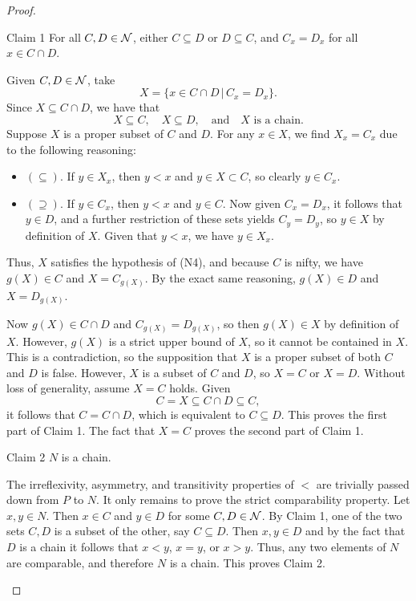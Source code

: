 \begin{proof}
	\begin{manualthm}{Claim 1}
		For all $C, D\in\mathcal{N}$, either $C\subseteq D$ or $D\subseteq C$, and $C_{x} = D_{x}$ for all $x\in C\cap D$. 
	\end{manualthm}
	\begin{claimproof}
		Given $C, D\in\mathcal{N}$, take 
		\[ X = \{ x\in C\cap D \,|\, C_{x} = D_{x} \}. \]
		Since $X\subseteq C\cap D$, we have that
		\[ X\subseteq C, \quad X\subseteq D, \quad\text{and}\quad X\text{ is a chain}. \]
		Suppose $X$ is a proper subset of $C$ and $D$.
		For any $x\in X$, we find $X_{x} = C_{x}$ due to the following reasoning:
		\begin{itemize}[itemsep=-0.0ex]
			\item $(\subseteq).$
			If $y\in X_{x}$, then $y < x$ and $y\in X\subset C$, so clearly $y\in C_{x}$.
			\item $(\supseteq).$
			If $y\in C_{x}$, then $y < x$ and $y\in C$. 
			Now given $C_{x} = D_{x}$, it follows that $y\in D$, and a further restriction of these sets yields $C_{y} = D_{y}$, so $y\in X$ by definition of $X$.
			Given that $y < x$, we have $y\in X_{x}$. 
		\end{itemize}
		Thus, $X$ satisfies the hypothesis of (N4), and because $C$ is nifty, we have $g(X)\in C$ and $X = C_{g(X)}$. 
		By the exact same reasoning, $g(X)\in D$ and $X = D_{g(X)}$. 
		
		Now $g(X)\in C\cap D$ and $C_{g(X)} = D_{g(X)}$, so then $g(X)\in X$ by definition of $X$.
		However, $g(X)$ is a strict upper bound of $X$, so it cannot be contained in $X$.
		This is a contradiction, so the supposition that $X$ is a proper subset of both $C$ and $D$ is false.
		However, $X$ is a subset of $C$ and $D$, so $X = C$ or $X = D$.
		Without loss of generality, assume $X = C$ holds. 
		Given 
		\[ C = X\subseteq C\cap D\subseteq C, \]
		it follows that $C = C\cap D$, which is equivalent to $C\subseteq D$. 
		This proves the first part of Claim 1. 
		The fact that $X = C$ proves the second part of Claim 1.
	\end{claimproof} 
	
	\begin{manualthm}{Claim 2}
		$N$ is a chain.
	\end{manualthm}
	\begin{claimproof}
		The irreflexivity, asymmetry, and transitivity properties of $<$ are trivially passed down from $P$ to $N$.
		It only remains to prove the strict comparability property. 
		Let $x, y\in N$.
		Then $x\in C$ and $y\in D$ for some $C, D\in\mathcal{N}$. 
		By Claim 1, one of the two sets $C, D$ is a subset of the other, say $C\subseteq D$.
		Then $x, y\in D$ and by the fact that $D$ is a chain it follows that $x < y$, $x = y$, or $x > y$.
		Thus, any two elements of $N$ are comparable, and therefore $N$ is a chain. 
		This proves Claim 2.
	\end{claimproof}
	

\end{proof}
